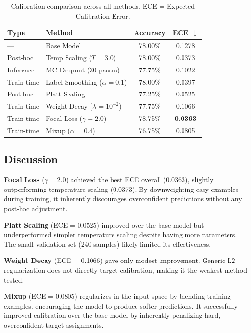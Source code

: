 \begin{table}[h]
\centering
\begin{tabular}{l l c c}
\toprule
\textbf{Type} & \textbf{Method} & \textbf{Accuracy} & \textbf{ECE $\downarrow$} \\
\midrule
--- & Base Model & 78.00\% & 0.1278 \\
\midrule
Post-hoc & Temp Scaling ($T\!=\!3.0$) & 78.00\% & 0.0373 \\
Inference & MC Dropout (30 passes) & 77.75\% & 0.1022 \\
Train-time & Label Smoothing ($\alpha\!=\!0.1$) & 78.00\% & 0.0397 \\
\midrule
Post-hoc & Platt Scaling & 77.25\% & 0.0525 \\
Train-time & Weight Decay ($\lambda\!=\!10^{-2}$) & 77.75\% & 0.1066 \\
Train-time & Focal Loss ($\gamma\!=\!2.0$) & 78.75\% & \textbf{0.0363} \\
Train-time & Mixup ($\alpha\!=\!0.4$) & 76.75\% & 0.0805 \\
\bottomrule
\end{tabular}
\caption{Calibration comparison across all methods. ECE = Expected Calibration Error.}
\label{tab:calibration_results}
\end{table}

\subsection*{Discussion}
\textbf{Focal Loss} ($\gamma\!=\!2.0$) achieved the best ECE overall (0.0363), slightly outperforming temperature scaling (0.0373). By downweighting easy examples during training, it inherently discourages overconfident predictions without any post-hoc adjustment.

\textbf{Platt Scaling} (ECE = 0.0525) improved over the base model but underperformed simpler temperature scaling despite having more parameters. The small validation set (240 samples) likely limited its effectiveness.

\textbf{Weight Decay} (ECE = 0.1066) gave only modest improvement. Generic L2 regularization does not directly target calibration, making it the weakest method tested.

\textbf{Mixup} (ECE = 0.0805) regularizes in the input space by blending training examples, encouraging the model to produce softer predictions. It successfully improved calibration over the base model by inherently penalizing hard, overconfident target assignments.

